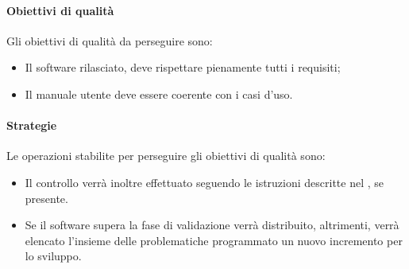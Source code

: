 \documentclass[../NormeDiProgetto_v4.0.0.tex]{subfiles}
\begin{document}
				\paragraph{Obiettivi di qualità}
				Gli obiettivi di qualità da perseguire sono:
				\begin{itemize}
					\item Il software rilasciato, deve rispettare pienamente tutti i requisiti;
					\item Il manuale utente deve essere coerente con i casi d'uso.
				\end{itemize}
				\paragraph{Strategie}
				Le operazioni stabilite per perseguire gli obiettivi di qualità sono:
				\begin{itemize}
					\item Il controllo verrà inoltre effettuato seguendo le istruzioni descritte nel \manualeutente, se presente.
					\item Se il software supera la fase di validazione verrà distribuito, altrimenti, verrà elencato l'insieme delle problematiche programmato un nuovo incremento per lo sviluppo.
				\end{itemize}	
					
\end{document}
